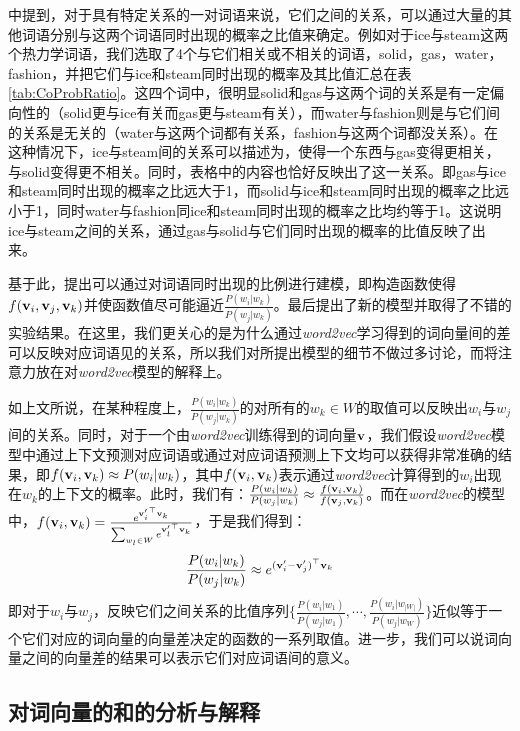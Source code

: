 \cite{pennington2014glove}中提到，对于具有特定关系的一对词语来说，它们之间的关系，可以通过大量的其他词语分别与这两个词语同时出现的概率之比值来确定。例如对于ice与steam这两个热力学词语，我们选取了4个与它们相关或不相关的词语，solid，gas，water，fashion，并把它们与ice和steam同时出现的概率及其比值汇总在表\ref{tab:CoProbRatio}。这四个词中，很明显solid和gas与这两个词的关系是有一定偏向性的（solid更与ice有关而gas更与steam有关），而water与fashion则是与它们间的关系是无关的（water与这两个词都有关系，fashion与这两个词都没关系）。在这种情况下，ice与steam间的关系可以描述为，使得一个东西与gas变得更相关，与solid变得更不相关。同时，表格中的内容也恰好反映出了这一关系。即gas与ice和steam同时出现的概率之比远大于1，而solid与ice和steam同时出现的概率之比远小于1，同时water与fashion同ice和steam同时出现的概率之比均约等于1。这说明ice与steam之间的关系，通过gas与solid与它们同时出现的概率的比值反映了出来。

基于此，\cite{pennington2014glove}提出可以通过对词语同时出现的比例进行建模，即构造函数使得$f({{\mathbf v}}_i, {{\mathbf v}}_j, {{\mathbf v}}_k)$并使函数值尽可能逼近$\frac{P(w_i|w_k)}{P(w_j|w_k)}$。最后提出了新的模型并取得了不错的实验结果。在这里，我们更关心的是为什么通过\emph{word2vec}学习得到的词向量间的差可以反映对应词语见的关系，所以我们对\citep{pennington2014glove}所提出模型的细节不做过多讨论，而将注意力放在对\emph{word2vec}模型的解释上。

如上文所说，在某种程度上，$\frac{P(w_i|w_k)}{P(w_j|w_k)}$的对所有的$w_k \in W$的取值可以反映出$w_i$与$w_j$间的关系。同时，对于一个由\emph{word2vec}训练得到的词向量${{\mathbf v}}$，我们假设\emph{word2vec}模型中通过上下文预测对应词语或通过对应词语预测上下文均可以获得非常准确的结果，即$f({{\mathbf v}}_i, {{\mathbf v}}_k) \approx P(w_i|w_k)$，其中$f({{\mathbf v}}_i, {{\mathbf v}}_k)$表示通过\emph{word2vec}计算得到的$w_i$出现在$w_k$的上下文的概率。此时，我们有：$\frac{P(w_i|w_k)}{P(w_j|w_k)}\approx \frac{f({{\mathbf v}}_i, {{\mathbf v}}_k)}{f({{\mathbf v}}_j, {{\mathbf v}}_k)}$。而在\emph{word2vec}的模型中，$f({{\mathbf v}}_i, {{\mathbf v}}_k) = \frac{e^{{{{\mathbf v}}'_i}^\top{{\mathbf v}}_k}}{\sum_{w_l \in W}e^{{{{\mathbf v}}'_l}^\top{{\mathbf v}}_k}}$，于是我们得到：
\begin{equation*}
\frac{P(w_i|w_k)}{P(w_j|w_k)}\approx e^{({{{\mathbf v}}'_i-{{\mathbf v}}'_j)}^\top{{\mathbf v}}_k}
\end{equation*}
即对于$w_i$与$w_j$，反映它们之间关系的比值序列$\{\frac{P(w_i|w_1)}{P(w_j|w_1)}, \cdots, \frac{P(w_i|w_{|W|})}{P(w_j|w_{W})}\}$近似等于一个它们对应的词向量的向量差决定的函数的一系列取值。进一步，我们可以说词向量之间的向量差的结果可以表示它们对应词语间的意义。

\subsection{对词向量的和的分析与解释}


